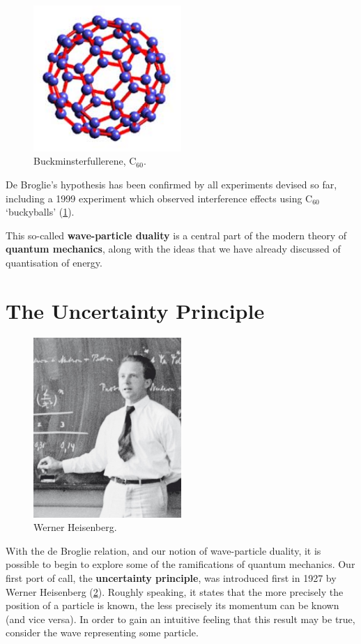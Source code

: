 \documentclass[a4paper]{amsbook}
\theoremstyle{definition}
\numberwithin{exercise}{chapter}
\numberwithin{exercise}{chapter}
\begin{document}
\begin{figure}
  \centering
  \includegraphics[width=0.5\textwidth]{c60}
  \caption{Buckminsterfullerene, $ \mathrm{C}_{60} $. \label{fig:c60}}
\end{figure}
De Broglie's hypothesis has been confirmed by all experiments devised so far, including a 1999 experiment which observed interference
effects using $ \mathrm{C}_{60} $ `buckyballs' (\cref{fig:c60}).

This so-called \textbf{wave-particle duality} is a central part of the modern theory of \textbf{quantum mechanics}, along with the
ideas that we have already discussed of quantisation of energy.

\section{The Uncertainty Principle}
\begin{figure}
  \centering
  \includegraphics[width=0.5\textwidth]{heisenberg}
  \caption{Werner Heisenberg. \label{fig:heisenberg}}
\end{figure}
With the de Broglie relation, and our notion of wave-particle duality, it is possible to begin to explore some of the ramifications of quantum
mechanics. Our first port of call, the \textbf{uncertainty principle}, was introduced first in 1927 by Werner Heisenberg (\cref{fig:heisenberg}).
Roughly speaking, it states that the more precisely the position of a particle is known, the less precisely its momentum can be known (and vice
versa). In order to gain an intuitive feeling that this result may be true, consider the wave representing some particle.
\end{document}

